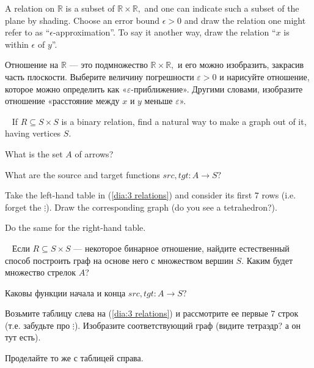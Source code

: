 \documentclass[../main/CT4S-EN-RU]{subfiles}
\begin{document}
\begin{exerciseENG}
A relation on ${ℝ}$ is a subset of ${ℝ}\times{ℝ},$ and one can indicate such a subset of the plane by shading. Choose an error bound $\epsilon>0$ and draw the relation one might refer to as “$\epsilon$-approximation”. To say it another way, draw the relation “$x$ is within $\epsilon$ of $y$”.
\end{exerciseENG}

\begin{exerciseRUS}
Отношение на ${ℝ}$ — это подмножество ${ℝ}\times{ℝ},$ и его можно изобразить, закрасив часть плоскости. Выберите величину погрешности $\varepsilon>0$ и нарисуйте отношение, которое можно определить как «$\varepsilon$-приближение». Другими словами, изобразите отношение «расстояние между $x$ и $y$ меньше $\varepsilon$».
\end{exerciseRUS}

\begin{exerciseENG}\label{exc:rel to graph}~
\sexc If $R\subseteq S\times S$ is a binary relation, find a natural way to make a graph out of it, having vertices $S.$ 
\item What is the set $A$ of arrows? 
\item What are the source and target functions $src,tgt\colon A{→} S?$
\item Take the left-hand table in (\ref{dia:3 relations}) and consider its first $7$ rows (i.e. forget the $\vdots$). Draw the corresponding graph (do you see a tetrahedron?). 
\item Do the same for the right-hand table.
\endsexc
\end{exerciseENG}

\begin{exerciseRUS}\label{exc:rel to graph}~
Если $R\subseteq S\times S$ — некоторое бинарное отношение, найдите естественный способ построить граф на основе него с множеством вершин $S.$ 
\sexc Каким будет множество стрелок $A$? 
\item Каковы функции начала и конца $src,tgt\colon A{→} S?$
\item Возьмите таблицу слева на (\ref{dia:3 relations}) и рассмотрите ее первые $7$ строк (т.е. забудьте про $\vdots$). Изобразите соответствующий граф (видите тетраэдр? а он тут есть). 
\item Проделайте то же с таблицей справа.
\endsexc
\end{exerciseRUS}
\end{document}
